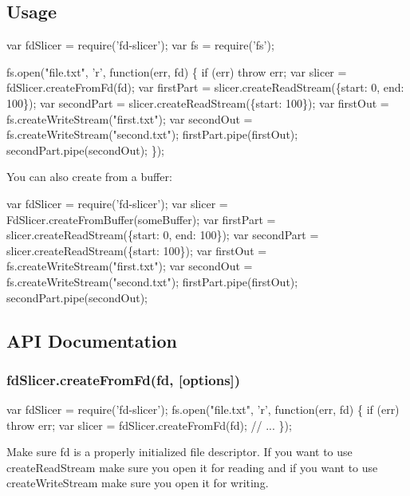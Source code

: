 \subsection*{Usage}


\begin{DoxyCode}
var fdSlicer = require('fd-slicer');
var fs = require('fs');

fs.open("file.txt", 'r', function(err, fd) \{
  if (err) throw err;
  var slicer = fdSlicer.createFromFd(fd);
  var firstPart = slicer.createReadStream(\{start: 0, end: 100\});
  var secondPart = slicer.createReadStream(\{start: 100\});
  var firstOut = fs.createWriteStream("first.txt");
  var secondOut = fs.createWriteStream("second.txt");
  firstPart.pipe(firstOut);
  secondPart.pipe(secondOut);
\});
\end{DoxyCode}


You can also create from a buffer\+:


\begin{DoxyCode}
var fdSlicer = require('fd-slicer');
var slicer = FdSlicer.createFromBuffer(someBuffer);
var firstPart = slicer.createReadStream(\{start: 0, end: 100\});
var secondPart = slicer.createReadStream(\{start: 100\});
var firstOut = fs.createWriteStream("first.txt");
var secondOut = fs.createWriteStream("second.txt");
firstPart.pipe(firstOut);
secondPart.pipe(secondOut);
\end{DoxyCode}


\subsection*{A\+PI Documentation}

\subsubsection*{fd\+Slicer.\+create\+From\+Fd(fd, \mbox{[}options\mbox{]})}


\begin{DoxyCode}
var fdSlicer = require('fd-slicer');
fs.open("file.txt", 'r', function(err, fd) \{
  if (err) throw err;
  var slicer = fdSlicer.createFromFd(fd);
  // ...
\});
\end{DoxyCode}


Make sure {\ttfamily fd} is a properly initialized file descriptor. If you want to use {\ttfamily create\+Read\+Stream} make sure you open it for reading and if you want to use {\ttfamily create\+Write\+Stream} make sure you open it for writing.


